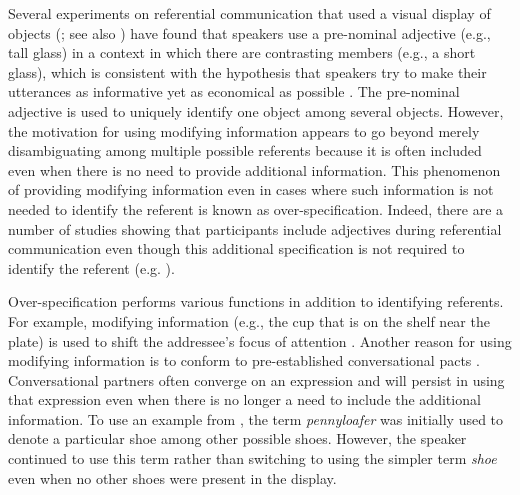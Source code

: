 \documentclass[output=paper]{langsci/langscibook}
\begin{document}
Several experiments on referential communication that used a visual
display of objects (\citealt{tanenhaus1995integration}; see also
\citealt{frank2012predicting}) have found that speakers use a
pre-nominal adjective (e.g., tall glass) in a context in which there
are contrasting members (e.g., a short glass), which is consistent
with the hypothesis that speakers try to make their utterances as
informative yet as economical as possible \citep{grice1975logic}. The
pre-nominal adjective is used to uniquely identify one object among
several objects. However, the motivation for using modifying
information appears to go beyond merely disambiguating among multiple
possible referents because it is often included even when there is no
need to provide additional information. This phenomenon of providing
modifying information even in cases where such information is not
needed to identify the referent is known as
over-specification. Indeed, there are a number of studies showing that
participants include adjectives during referential communication even
though this additional specification is not required to identify the
referent
(e.g. \citealt{pechmann1989incremental,sedivy2003pragmatic,maes2004reference,koolen2013effect}).

Over-specification performs various functions in addition to
identifying referents. For example, modifying information (e.g., the
cup that is on the shelf near the plate) is used to shift the
addressee’s focus of attention \citep{mira1990accessing,prince1992zpg,gundel1993cognitive,chafe1994discourse}. Another reason for using
modifying information is to conform to pre-established conversational
pacts \citep{brennan1996conceptual,ibarra2016flexibility}. Conversational partners often converge on an expression and
will persist in using that expression even when there is no longer a
need to include the additional information. To use an example from
\citet{brennan1996conceptual}, the term \textit{pennyloafer} was initially
used to denote a particular shoe among other possible shoes. However,
the speaker continued to use this term rather than switching to using
the simpler term \textit{shoe} even when no other shoes were present
in the display.
\end{document}
